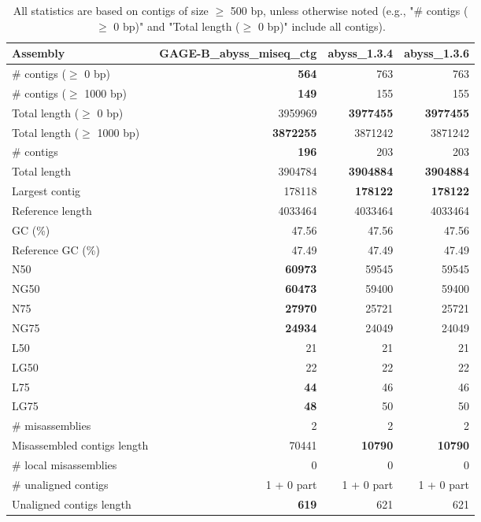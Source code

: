 \documentclass[12pt,a4paper]{article}
\begin{document}
\begin{table}[ht]
\begin{center}
\caption{All statistics are based on contigs of size $\geq$ 500 bp, unless otherwise noted (e.g., "\# contigs ($\geq$ 0 bp)" and "Total length ($\geq$ 0 bp)" include all contigs).}
\begin{tabular}{|l*{3}{|r}|}
\hline
Assembly & GAGE-B\_abyss\_miseq\_ctg & abyss\_1.3.4 & abyss\_1.3.6 \\ \hline
\# contigs ($\geq$ 0 bp) & {\bf 564} & 763 & 763 \\ \hline
\# contigs ($\geq$ 1000 bp) & {\bf 149} & 155 & 155 \\ \hline
Total length ($\geq$ 0 bp) & 3959969 & {\bf 3977455} & {\bf 3977455} \\ \hline
Total length ($\geq$ 1000 bp) & {\bf 3872255} & 3871242 & 3871242 \\ \hline
\# contigs & {\bf 196} & 203 & 203 \\ \hline
Total length & 3904784 & {\bf 3904884} & {\bf 3904884} \\ \hline
Largest contig & 178118 & {\bf 178122} & {\bf 178122} \\ \hline
Reference length & 4033464 & 4033464 & 4033464 \\ \hline
GC (\%) & 47.56 & 47.56 & 47.56 \\ \hline
Reference GC (\%) & 47.49 & 47.49 & 47.49 \\ \hline
N50 & {\bf 60973} & 59545 & 59545 \\ \hline
NG50 & {\bf 60473} & 59400 & 59400 \\ \hline
N75 & {\bf 27970} & 25721 & 25721 \\ \hline
NG75 & {\bf 24934} & 24049 & 24049 \\ \hline
L50 & 21 & 21 & 21 \\ \hline
LG50 & 22 & 22 & 22 \\ \hline
L75 & {\bf 44} & 46 & 46 \\ \hline
LG75 & {\bf 48} & 50 & 50 \\ \hline
\# misassemblies & 2 & 2 & 2 \\ \hline
Misassembled contigs length & 70441 & {\bf 10790} & {\bf 10790} \\ \hline
\# local misassemblies & 0 & 0 & 0 \\ \hline
\# unaligned contigs & 1 + 0 part & 1 + 0 part & 1 + 0 part \\ \hline
Unaligned contigs length & {\bf 619} & 621 & 621 \\ \hline

\end{tabular}
\end{center}
\end{table}
\end{document}
